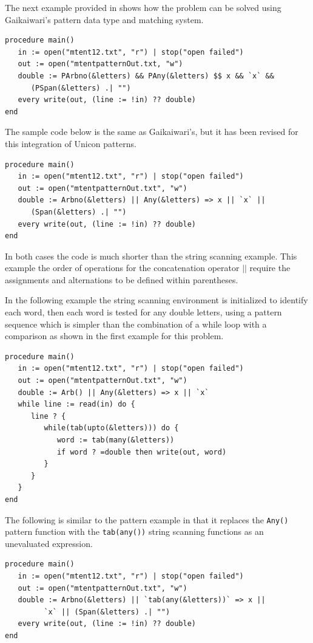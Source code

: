 \documentclass{article}
\begin{document}
The next example provided in \cite{Gaikaiwari2005} shows how the problem can be solved using Gaikaiwari's pattern data type and matching system.  
\begin{verbatim}
procedure main()
   in := open("mtent12.txt", "r") | stop("open failed")
   out := open("mtentpatternOut.txt, "w")
   double := PArbno(&letters) && PAny(&letters) $$ x && `x` && 
      (PSpan(&letters) .| "")
   every write(out, (line := !in) ?? double)
end
\end{verbatim}

The sample code below is the same as Gaikaiwari's, but it has been revised for this integration of Unicon patterns.
\begin{verbatim}
procedure main()
   in := open("mtent12.txt", "r") | stop("open failed")
   out := open("mtentpatternOut.txt", "w")
   double := Arbno(&letters) || Any(&letters) => x || `x` ||
      (Span(&letters) .| "")
   every write(out, (line := !in) ?? double)
end 
\end{verbatim}
In both cases the code is much shorter than the string scanning example.  This example the order of operations for the concatenation operator \texttt{$||$} require the assignments and alternations to be defined within parentheses.  

In the following example the string scanning environment is initialized to identify each word, then each word is tested for any double letters, using a pattern sequence which is simpler than the combination of a while loop with a comparison as shown in the first example for this problem.
\begin{verbatim}
procedure main()
   in := open("mtent12.txt", "r") | stop("open failed")
   out := open("mtentpatternOut.txt", "w")
   double := Arb() || Any(&letters) => x || `x`
   while line := read(in) do {
      line ? {
         while(tab(upto(&letters))) do {
            word := tab(many(&letters))
            if word ? =double then write(out, word)
         }
      }
   }
end 
\end{verbatim}

The following is similar to the pattern example in that it replaces the \texttt{Any()} pattern function with the \texttt{tab(any())} string scanning functions as an unevaluated expression.
\begin{verbatim}
procedure main()
   in := open("mtent12.txt", "r") | stop("open failed")
   out := open("mtentpatternOut.txt", "w")
   double := Arbno(&letters) || `tab(any(&letters))` => x ||
         `x` || (Span(&letters) .| "")
   every write(out, (line := !in) ?? double)
end 
\end{verbatim}
\end{document}

